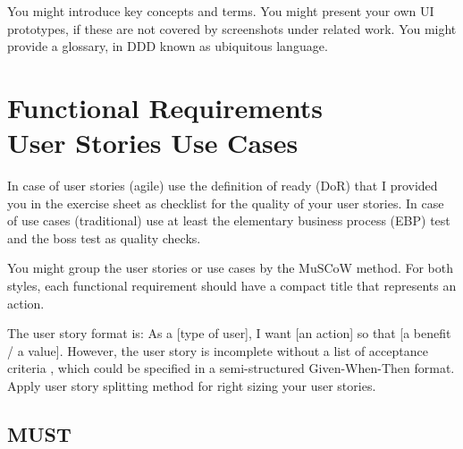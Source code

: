\documentclass[conference,a4paper,flushend]{cs-techrep}
\begin{document}
You might introduce key concepts \faWarning{} and terms. 
You might present your own UI prototypes, if these are not covered by screenshots under related work.
You might provide a glossary, in DDD known as ubiquitous language.


\section{Functional Requirements \textbar{}\\User Stories \textbar{} Use Cases}

In case of user stories (agile) use the definition of ready (DoR) \faWarning{} that I provided you in the exercise sheet as checklist for the quality of your user stories. In case of use cases (traditional) use at least the elementary business process (EBP) test and the boss test as quality checks.

You might group the user stories or use cases by the MuSCoW \faWarning{} method.
For both styles, each functional requirement should have a compact title that represents an action.

The user story format \faWarning{} is: As a [type of user], I want [an action] so that [a benefit / a value]. However, the user story is incomplete without a list of acceptance criteria \faWarning{}, which could be specified in a semi-structured Given-When-Then format. Apply user story splitting \faWarning{} method for right sizing your user stories.

\subsection{MUST}
\end{document}
